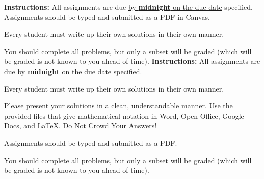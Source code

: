 \newcommand{\CMX}{\text{CMX}}
\newcommand{\ORD}{\text{ORD}}
\newcommand{\DTW}{\text{DTW}}
\newcommand{\MQT}{\text{MQT}}
\newcommand{\MSP}{\text{MSP}}



\extrawidth{0.5in} \extrafootheight{-0in} \pagestyle{headandfoot}
\headrule {} \footrule {}


\ifprintanswers
\noindent \textbf{Instructions:} All assignments are due \underline{by \textbf{midnight} on the due date} specified.  Assignments should be typed and submitted as a PDF in Canvas.   

\medskip
\noindent Every student must write up their own solutions in their own manner.

\medskip
\noindent You should \underline{complete all problems}, but \underline{only a subset will be graded} (which will be graded is not known to you ahead of time). 
\else
\noindent \textbf{Instructions:} All assignments are due \underline{by \textbf{midnight} on the due date} specified.  

\medskip
\noindent Every student must write up their own solutions in their own manner.

\medskip
\noindent Please present your solutions in a clean, understandable
manner.  Use the provided files that give mathematical notation in Word, Open Office, Google Docs, and \LaTeX.  Do Not Crowd Your Answers!

\medskip
\noindent Assignments should be typed and submitted as a PDF. 

\medskip
\noindent You should \underline{complete all problems}, but \underline{only a subset will be graded} (which will be graded is not known to you ahead of time). 
\fi


